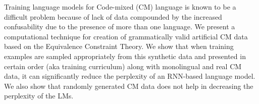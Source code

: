 Training language models for Code-mixed (CM) language is known to be a difficult problem because of lack of data compounded by the increased confusability due to the presence of more than one language. We present a computational technique for creation of grammatically valid artificial CM data based on the Equivalence Constraint Theory. We show that when training examples are sampled appropriately from this synthetic data and presented in certain order (aka training curriculum) along with monolingual and real CM data, it can significantly reduce the perplexity of an RNN-based language model. We also show that randomly generated CM data does not help in decreasing the perplexity of the LMs.
